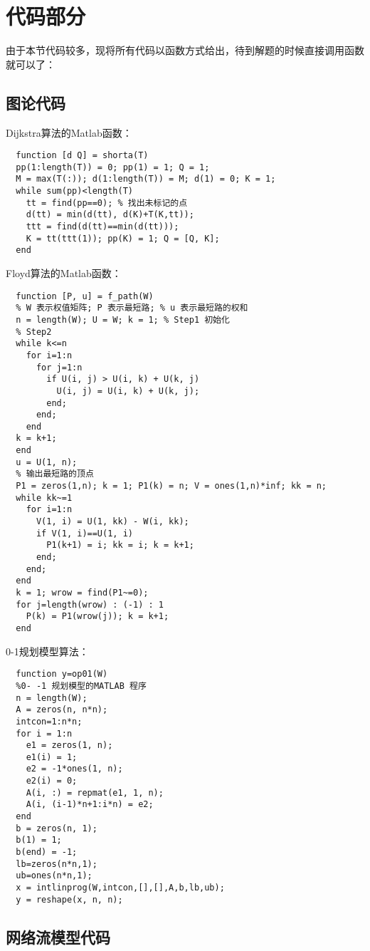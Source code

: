 \section{代码部分}
	\noindent 由于本节代码较多，现将所有代码以函数方式给出，待到解题的时候直接调用函数就可以了：\par
	\subsection{图论代码}
	\noindent Dijkstra算法的Matlab函数：
\begin{lstlisting}
  function [d Q] = shorta(T)
  pp(1:length(T)) = 0; pp(1) = 1; Q = 1;
  M = max(T(:)); d(1:length(T)) = M; d(1) = 0; K = 1;
  while sum(pp)<length(T)
    tt = find(pp==0); % 找出未标记的点
    d(tt) = min(d(tt), d(K)+T(K,tt));
    ttt = find(d(tt)==min(d(tt)));
    K = tt(ttt(1)); pp(K) = 1; Q = [Q, K];
  end
\end{lstlisting}
\noindent Floyd算法的Matlab函数：
\begin{lstlisting}
  function [P, u] = f_path(W)
  % W 表示权值矩阵; P 表示最短路; % u 表示最短路的权和
  n = length(W); U = W; k = 1; % Step1 初始化
  % Step2
  while k<=n
    for i=1:n
      for j=1:n
        if U(i, j) > U(i, k) + U(k, j)
          U(i, j) = U(i, k) + U(k, j);
        end;
      end; 
    end
  k = k+1;
  end
  u = U(1, n);
  % 输出最短路的顶点
  P1 = zeros(1,n); k = 1; P1(k) = n; V = ones(1,n)*inf; kk = n;
  while kk~=1
    for i=1:n
      V(1, i) = U(1, kk) - W(i, kk);
      if V(1, i)==U(1, i)
        P1(k+1) = i; kk = i; k = k+1;
      end; 
    end;
  end
  k = 1; wrow = find(P1~=0);
  for j=length(wrow) : (-1) : 1
    P(k) = P1(wrow(j)); k = k+1;
  end
\end{lstlisting}
0-1规划模型算法：
\begin{lstlisting}
  function y=op01(W)
  %0- -1 规划模型的MATLAB 程序
  n = length(W); 
  A = zeros(n, n*n);
  intcon=1:n*n;
  for i = 1:n
    e1 = zeros(1, n);
    e1(i) = 1;
    e2 = -1*ones(1, n);
    e2(i) = 0;
    A(i, :) = repmat(e1, 1, n);
    A(i, (i-1)*n+1:i*n) = e2;
  end
  b = zeros(n, 1);
  b(1) = 1;
  b(end) = -1;
  lb=zeros(n*n,1);
  ub=ones(n*n,1);
  x = intlinprog(W,intcon,[],[],A,b,lb,ub);
  y = reshape(x, n, n);
\end{lstlisting}
\subsection{网络流模型代码}
